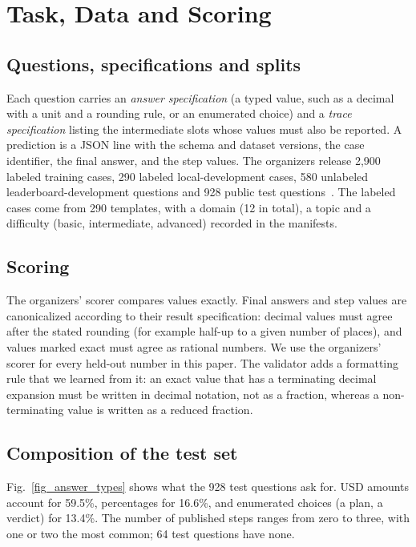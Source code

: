 \documentclass[conference]{IEEEtran}
\begin{document}
\section{Task, Data and Scoring}
\subsection{Questions, specifications and splits}
Each question carries an \emph{answer specification} (a typed value, such as a
decimal with a unit and a rounding rule, or an enumerated choice) and a
\emph{trace specification} listing the intermediate slots whose values must also
be reported. A prediction is a JSON line with the schema and dataset versions,
the case identifier, the final answer, and the step values. The organizers
release 2{,}900 labeled training cases, 290 labeled local-development cases, 580
unlabeled leaderboard-development questions and 928 public test
questions~\cite{finreason2026task1overview}. The labeled cases come from 290
templates, with a domain (12 in total), a topic and a difficulty (basic,
intermediate, advanced) recorded in the manifests.

\subsection{Scoring}
The organizers' scorer compares values exactly. Final answers and step values
are canonicalized according to their result specification: decimal values must
agree after the stated rounding (for example half-up to a given number of
places), and values marked exact must agree as rational numbers. We use the
organizers' scorer for every held-out number in this paper. The validator adds a
formatting rule that we learned from it: an exact value that has a terminating
decimal expansion must be written in decimal notation, not as a fraction,
whereas a non-terminating value is written as a reduced fraction.

\subsection{Composition of the test set}
Fig.~\ref{fig_answer_types} shows what the 928 test questions ask for. USD
amounts account for 59.5\%, percentages for 16.6\%, and enumerated choices (a
plan, a verdict) for 13.4\%. The number of published steps ranges from zero to
three, with one or two the most common; 64 test questions have none.
\end{document}
